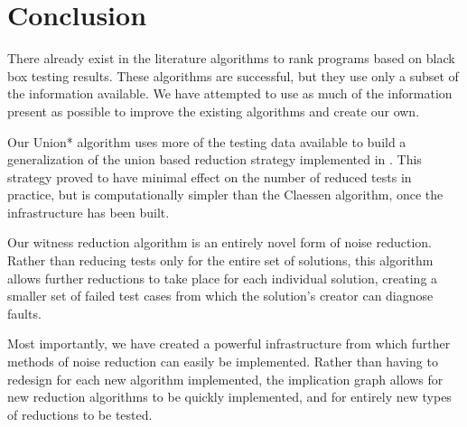 \documentclass[11pt]{article}
\begin{document}
\section{Conclusion}
There already exist in the literature algorithms to rank programs based on black box testing results. These algorithms are successful, but they use only a subset of the information available. We have attempted to use as much of the information present as possible to improve the existing algorithms and create our own.

Our Union* algorithm uses more of the testing data available to build a generalization of the union based reduction strategy implemented in \cite{Claessen}. This strategy proved to have minimal effect on the number of reduced tests in practice, but is computationally simpler than the Claessen algorithm, once the infrastructure has been built.

Our witness reduction algorithm is an entirely novel form of noise reduction. Rather than reducing tests only for the entire set of solutions, this algorithm allows further reductions to take place for each individual solution, creating a smaller set of failed test cases from which the solution's creator can diagnose faults.

Most importantly, we have created a powerful infrastructure from which further methods of noise reduction can easily be implemented. Rather than having to redesign for each new algorithm implemented, the implication graph allows for new reduction algorithms to be quickly implemented, and for entirely new types of reductions to be tested.



\end{document}
